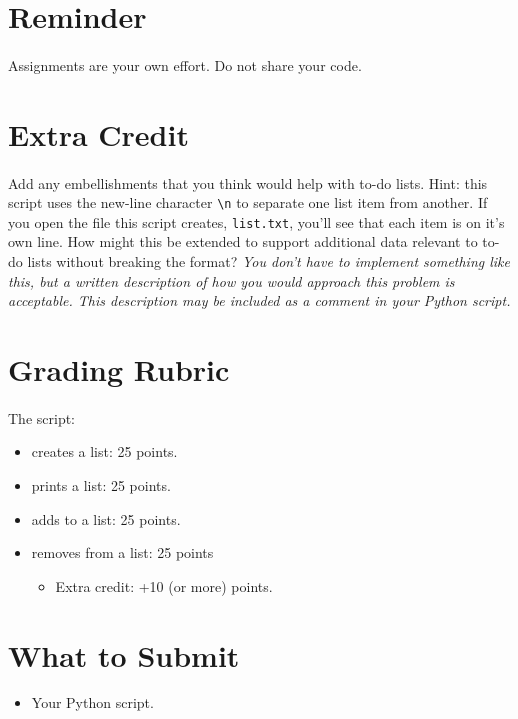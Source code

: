 \documentclass[letter,10pt]{article}
\begin{document}
    \section*{Reminder}
    \paragraph{}Assignments are your own effort. Do not share your code.
    
    \section*{Extra Credit}
    \paragraph{}Add any embellishments that you think would help with to-do lists. Hint: this script uses the new-line character \verb|\n| to separate one list item from another. If you open the file this script creates, \verb|list.txt|, you'll see that each item is on it's own line. How might this be extended to support additional data relevant to to-do lists without breaking the format? \textit{You don't have to implement something like this, but a written description of how you would approach this problem is acceptable. This description may be included as a comment in your Python script.}
    
    \section*{Grading Rubric}
    \paragraph{}The script:
    \begin{itemize}
        \item creates a list: 25 points.
        \item prints a list: 25 points.
        \item adds to a list: 25 points.
        \item removes from a list: 25 points
        \begin{itemize}
            \item Extra credit: +10 (or more) points.
        \end{itemize}
    \end{itemize}
    
    \section*{What to Submit}
    \begin{itemize}
        \item Your Python script.
    \end{itemize}
    
\end{document}
